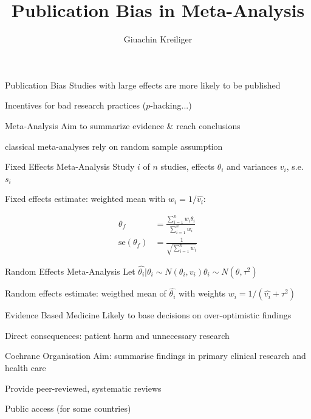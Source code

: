 \documentclass[english]{beamer}\usepackage[]{graphicx}\usepackage[]{color}
\title{Publication Bias in Meta-Analysis}%
\author{Giuachin Kreiliger}
\begin{document}
\maketitle

% 
% 

\begin{frame}{Publication Bias}
Studies with large effects are more likely to be published

Incentives for bad research practices ($p$-hacking...)
\end{frame}

\begin{frame}{Meta-Analysis}
Aim to summarize evidence \& reach conclusions

classical meta-analyses rely on random sample assumption
\end{frame}

\begin{frame}{Fixed Effects Meta-Analysis}
Study $i$ of $n$ studies, effects $\theta_i$ and variances $v_i$, s.e. $s_i$

Fixed effects estimate: weighted mean with $w_i = 1/\hat{v_i}$: 

\begin{align}
\theta_f &= \frac{\sum_{i = 1}^n w_{i}\theta_i}{\sum_{i = 1}^n w_i} \nonumber \\ 
\textrm{se}(\theta_f) &= \frac{1}{\sqrt{\sum_{i = 1}^n w_i}} \nonumber
\end{align}
\end{frame}

\begin{frame}{Random Effects Meta-Analysis}
Let $\hat{\theta_i}|\theta_i \sim N(\theta_i, v_i) 
\theta_i \sim N(\theta, \tau^2)$

Random effects estimate: weigthed mean of $\hat{\theta_i}$ with weights $w_i = 1/(\hat{v_i} + \tau^2)$
\end{frame}

\begin{frame}{Evidence Based Medicine}
Likely to base decisions on over-optimistic findings

Direct consequences: patient harm and unnecessary research
\end{frame}


\begin{frame}{Cochrane Organisation}
Aim: summarise findings in primary clinical research and health care

Provide peer-reviewed, systematic reviews

Public access (for some countries)
\end{frame}
\end{document}
